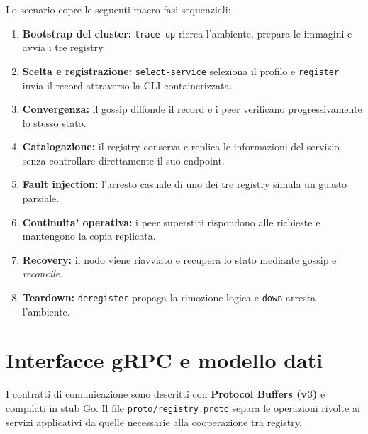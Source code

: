 \documentclass[conference]{IEEEtran}
\begin{document}
Lo scenario copre le seguenti macro-fasi sequenziali:

\begin{enumerate}
  \item \textbf{Bootstrap del cluster:} \texttt{trace-up} ricrea l'ambiente, prepara le immagini e avvia i tre registry.
  \item \textbf{Scelta e registrazione:} \texttt{select-service} seleziona il profilo e \texttt{register} invia il record attraverso la CLI containerizzata.
  \item \textbf{Convergenza:} il gossip diffonde il record e i peer verificano progressivamente lo stesso stato.
  \item \textbf{Catalogazione:} il registry conserva e replica le informazioni del servizio senza controllare direttamente il suo endpoint.
  \item \textbf{Fault injection:} l'arresto casuale di uno dei tre registry simula un guasto parziale.
  \item \textbf{Continuita' operativa:} i peer superstiti rispondono alle richieste e mantengono la copia replicata.
  \item \textbf{Recovery:} il nodo viene riavviato e recupera lo stato mediante gossip e \textit{reconcile}.
  \item \textbf{Teardown:} \texttt{deregister} propaga la rimozione logica e \texttt{down} arresta l'ambiente.
\end{enumerate}

\section{Interfacce gRPC e modello dati}
I contratti di comunicazione sono descritti con \textbf{Protocol Buffers (v3)} e compilati in stub Go. Il file \texttt{proto/registry.proto} separa le operazioni rivolte ai servizi applicativi da quelle necessarie alla cooperazione tra registry.
\end{document}
